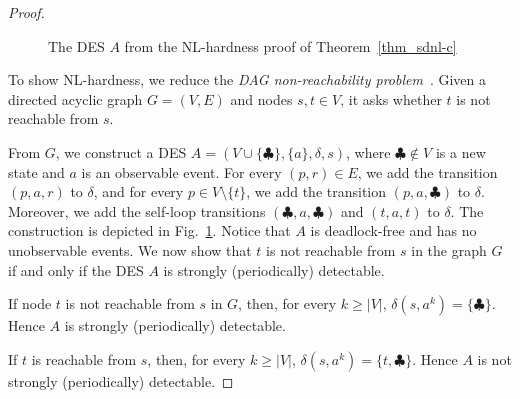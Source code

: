 \documentclass[twocolumn,amsthm]{autartx}
\begin{document}
\begin{proof}
    \begin{figure}
      \centering
      \caption{The DES $A$ from the NL-hardness proof of Theorem~\ref{thm_sdnl-c}}
      \label{fig1}
    \end{figure}

    To show NL-hardness, we reduce the {\em DAG non-reachability problem}~\cite{ChoH91}. Given a directed acyclic graph $G=(V,E)$ and nodes $s,t\in V$, it asks whether $t$ is not reachable from $s$. 
    
    From $G$, we construct a DES $A=(V\cup\{\clubsuit\},\{a\},\delta,s)$, where $\clubsuit\notin V$ is a new state and $a$ is an observable event. For every $(p,r)\in E$, we add the transition $(p,a,r)$ to $\delta$, and for every $p\in V\setminus\{t\}$, we add the transition $(p,a,\clubsuit)$ to $\delta$. Moreover, we add the self-loop transitions $(\clubsuit,a,\clubsuit)$ and $(t,a,t)$ to $\delta$. The construction is depicted in Fig.~\ref{fig1}. Notice that $A$ is deadlock-free and has no unobservable events. We now show that $t$ is not reachable from $s$ in the graph $G$ if and only if the DES $A$ is strongly (periodically) detectable.

    If node $t$ is not reachable from $s$ in $G$, then, for every $k\ge |V|$, $\delta(s,a^k)=\{\clubsuit\}$. Hence $A$ is strongly (periodically) detectable. 
    
    If $t$ is reachable from $s$, then, for every $k\ge |V|$, $\delta(s,a^k)=\{t,\clubsuit\}$. Hence $A$ is not strongly (periodically) detectable.
  \end{proof}
\end{document}
